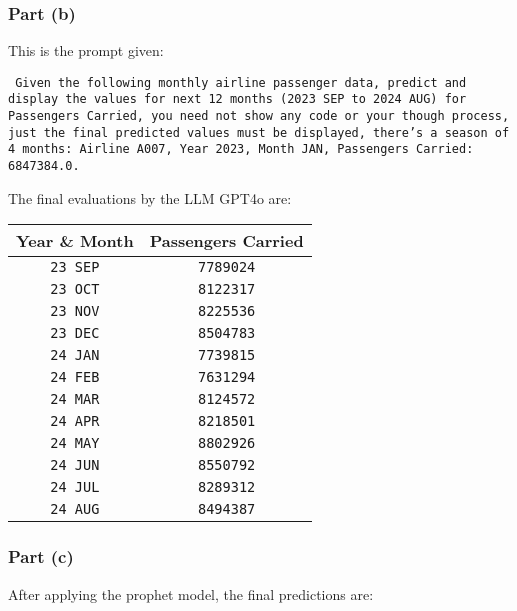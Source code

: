 \subsubsection{Part (b)}

This is the prompt given:
\begin{center}
	\texttt{
		Given the following monthly airline passenger data, predict and display the
		values for next 12 months (2023 SEP to 2024 AUG) for Passengers Carried, you
		need not show any code or your though process, just the final predicted values
		must be displayed, there's a season of 4 months: Airline A007, Year 2023,
		Month JAN, Passengers Carried: 6847384.0.
	}
\end{center}

The final evaluations by the LLM GPT4o are:

\begin{center}
	\begin{tabular}{|c|c|}
		\hline
		Year \& Month   & Passengers Carried \\
		\hline
		\texttt{23 SEP} & \texttt{7789024}   \\
		\texttt{23 OCT} & \texttt{8122317}   \\
		\texttt{23 NOV} & \texttt{8225536}   \\
		\texttt{23 DEC} & \texttt{8504783}   \\
		\texttt{24 JAN} & \texttt{7739815}   \\
		\texttt{24 FEB} & \texttt{7631294}   \\
		\texttt{24 MAR} & \texttt{8124572}   \\
		\texttt{24 APR} & \texttt{8218501}   \\
		\texttt{24 MAY} & \texttt{8802926}   \\
		\texttt{24 JUN} & \texttt{8550792}   \\
		\texttt{24 JUL} & \texttt{8289312}   \\
		\texttt{24 AUG} & \texttt{8494387}   \\
		\hline
	\end{tabular}
\end{center}

\subsubsection{Part (c)}

After applying the prophet model, the final predictions are:

